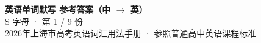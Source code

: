 \documentclass[10pt,a4paper]{article}
\begin{document}
\pagestyle{plain}

\begin{center}
{\LARGE\bfseries 英语单词默写 \quad 参考答案（中 $\to$ 英）}\\[0.22em]
{\large S 字母 · 第 1 / 9 份}\\[0.18em]
{\small 2026年上海市高考英语词汇用法手册 · 参照普通高中英语课程标准}
\end{center}

\vspace{0.2em}
\noindent{\color{rulegray}\rule{\textwidth}{0.8pt}}

\vspace{0.35em}

\vspace{0.25em}
\renewcommand{\arraystretch}{1.32}
\end{document}
